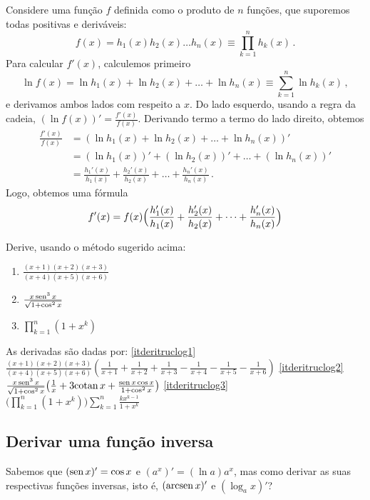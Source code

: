 Considere uma função $f$ definida como o produto de $n$ funções, que suporemos
todas positivas e deriváveis: 
$$f(x)=h_1(x)h_2(x)\dots h_n(x)\equiv \prod_{k=1}^nh_k(x)\,.$$ 
Para calcular $f'(x)$, calculemos
primeiro
$$\ln f(x)=\ln h_1(x)+\ln h_2(x)+\dots+\ln h_n(x)\equiv \sum_{k=1}^n\ln
h_k(x)\,,$$ 
e derivamos ambos lados
com respeito a $x$. Do lado esquerdo, usando a regra da cadeia, $(\ln
f(x))'=\frac{f'(x)}{f(x)}$. Derivando termo a termo do lado direito, obtemos
\begin{align*}
\frac{f'(x)}{f(x)}&=(\ln h_1(x)+\ln h_2(x)+\dots+\ln h_n(x))'\\
&=(\ln h_1(x))'+(\ln h_2(x))'+\dots+(\ln h_n(x))'\\
&=\frac{h_1'(x)}{h_1(x)}+\frac{h_2'(x)}{h_2(x)}+\dots+\frac{h_n'(x)}{h_n(x)}\,.
\end{align*}
Logo, obtemos uma fórmula
$$
f'(x)=f(x)\Bigl(
\frac{h_1'(x)}{h_1(x)}+\frac{h_2'(x)}{h_2(x)}+\dots+\frac{h_n'(x)}{h_n(x)}
\Bigr)
$$

\begin{exo}
Derive, usando o método sugerido acima:
\begin{multicols}{3}
\begin{enumerate}
\item\label{itderitruclog1} $\frac{(x+1)(x+2)(x+3)}{(x+4)(x+5)(x+6)}$
\item\label{itderitruclog2} $\frac{x\operatorname{sen}^3x}{\sqrt{1+\cos^2x}}$
\item\label{itderitruclog3} $\prod_{k=1}^n(1+x^k)$
\end{enumerate}
\end{multicols}
\vspace{0.01cm}
\begin{sol} As derivadas são dadas por:
\eqref{itderitruclog1}
$\frac{(x+1)(x+2)(x+3)}{(x+4)(x+5)(x+6)}
(\frac{1}{x+1}+\frac{1}{x+2}+\frac{1}{x+3}-\frac{1}{x+4}-\frac{1}{x+5}-\frac{1}{
x+6})$
\eqref{itderitruclog2}
$\frac{x\operatorname{sen}^3x}{\sqrt{1+\cos^2x}}\bigl(\frac{1}{x}+3{\rm cotan\,} x+\frac{\operatorname{sen} 
x\cos x}{{1+\cos^2x}}\bigr)$
\eqref{itderitruclog3}
$\bigl(\prod_{k=1}^n(1+x^k)\bigr)\sum_{k=1}^n\frac{kx^{k-1}}{1+x^k}$
\end{sol}
\end{exo}


\subsection{Derivar uma função inversa}\label{Sec:DerivInversa}
Sabemos que $(\operatorname{sen} x)'=\cos x$ e $(a^x)'=(\ln a)a^x$, mas como derivar as suas
respectivas funções inversas, isto é, $(\operatorname{arcsen} x)'$ e $(\log_ax)'$?\\
 

